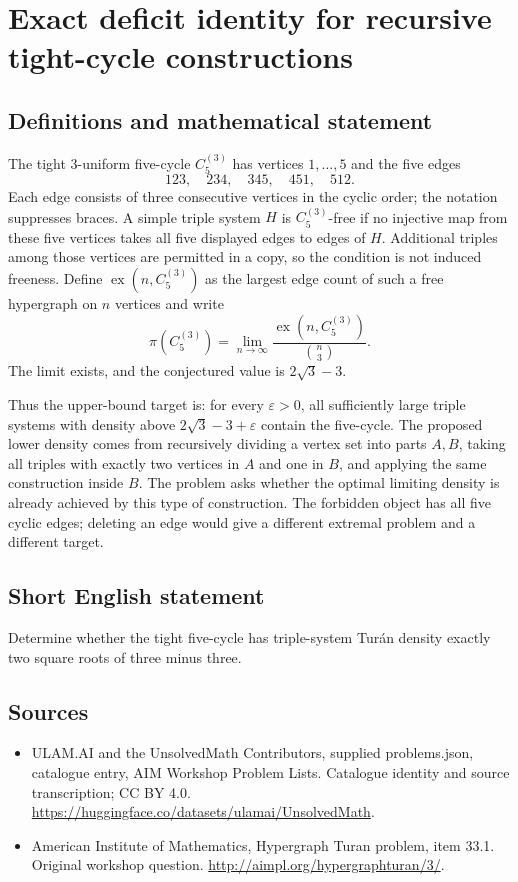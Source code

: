 \documentclass[11pt,a4paper]{article}
\begin{document}
\section*{Exact deficit identity for recursive tight-cycle constructions}\label{statement}

\subsection{Definitions and mathematical statement}
The tight $3$-uniform five-cycle $C_5^{(3)}$ has vertices $1,\ldots,5$
and the five edges
\[
                 123,\quad234,\quad345,\quad451,\quad512.
\]
Each edge consists of three consecutive vertices in the cyclic order;
the notation suppresses braces. A simple triple system $H$ is
$C_5^{(3)}$-free if no injective map from these five vertices takes
all five displayed edges to edges of $H$. Additional triples among
those vertices are permitted in a copy, so the condition is not
induced freeness.
Define $\operatorname{ex}(n,C_5^{(3)})$ as the largest edge count of
such a free hypergraph on $n$ vertices and write
\[
 \pi(C_5^{(3)})=\lim_{n\to\infty}
       \frac{\operatorname{ex}(n,C_5^{(3)})}{\binom n3}.
\]
The limit exists, and the conjectured value is $2\sqrt3-3$.

Thus the upper-bound target is: for every $\varepsilon>0$, all
sufficiently large triple systems with density above
$2\sqrt3-3+\varepsilon$ contain the five-cycle. The proposed lower
density comes from recursively dividing a vertex set into parts
$A,B$, taking all triples with exactly two vertices in $A$ and one
in $B$, and applying the same construction inside $B$.
The problem asks whether the optimal limiting density is already
achieved by this type of construction. The forbidden object has all
five cyclic edges; deleting an edge would give a different extremal
problem and a different target.
\subsection{Short English statement}
Determine whether the tight five-cycle has triple-system Turán density exactly two square roots of three minus three.
\subsection{Sources}
\begin{itemize}
\item[S1] ULAM.AI and the UnsolvedMath Contributors, supplied problems.json, catalogue entry, AIM Workshop Problem Lists. Catalogue identity and source transcription; CC BY 4.0.
\url{https://huggingface.co/datasets/ulamai/UnsolvedMath}.
\item[S2] American Institute of Mathematics, Hypergraph Turan problem, item 33.1. Original workshop question.
\url{http://aimpl.org/hypergraphturan/3/}.
\end{itemize}
\end{document}
